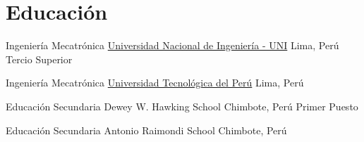 \section{Educación}

{Ingeniería Mecatrónica}
{\href{http://en.wikipedia.org/wiki/National_University_of_Engineering}{Universidad Nacional de Ingeniería - UNI}}
{Lima, Perú}{}
{Tercio Superior} 

{Ingeniería Mecatrónica}
{\href{http://www.utp.edu.pe/}{Universidad Tecnológica del Perú}}
{Lima, Perú}{}
{}

{Educación Secundaria}
{Dewey W. Hawking School}
{Chimbote, Perú}{}
{Primer Puesto} 

{Educación Secundaria}
{Antonio Raimondi School}
{Chimbote, Perú}{}
{}